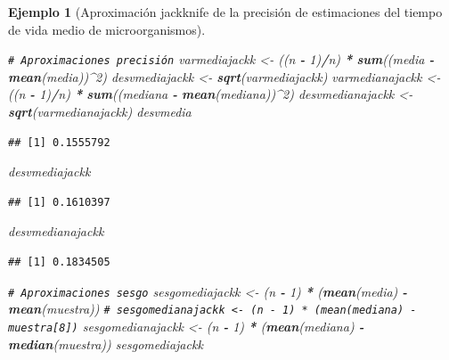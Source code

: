 \documentclass[
]{book}
\newenvironment{Shaded}{\begin{snugshade}}{\end{snugshade}}
\newcommand{\CommentTok}[1]{\textcolor[rgb]{0.56,0.35,0.01}{\textit{#1}}}
\newcommand{\DecValTok}[1]{\textcolor[rgb]{0.00,0.00,0.81}{#1}}
\newcommand{\FunctionTok}[1]{\textcolor[rgb]{0.13,0.29,0.53}{\textbf{#1}}}
\newcommand{\NormalTok}[1]{#1}
\newcommand{\OtherTok}[1]{\textcolor[rgb]{0.56,0.35,0.01}{#1}}
\newcommand{\SpecialCharTok}[1]{\textcolor[rgb]{0.81,0.36,0.00}{\textbf{#1}}}
\theoremstyle{break}
\newtheorem{example}{Ejemplo}[chapter]
\theoremstyle{nonumberplain}
\renewcommand{\CommentTok}[1]{\textcolor[rgb]{0.41,0.41,0.41}{\texttt{#1}}}
\begin{document}
\begin{example}[Aproximación jackknife de la precisión de estimaciones del tiempo de vida medio de microorganismos]
\begin{Shaded}
\begin{Highlighting}[]
\CommentTok{\# Aproximaciones precisión}
\NormalTok{varmediajackk }\OtherTok{\textless{}{-}}\NormalTok{ ((n }\SpecialCharTok{{-}} \DecValTok{1}\NormalTok{)}\SpecialCharTok{/}\NormalTok{n) }\SpecialCharTok{*} \FunctionTok{sum}\NormalTok{((media }\SpecialCharTok{{-}} \FunctionTok{mean}\NormalTok{(media))}\SpecialCharTok{\^{}}\DecValTok{2}\NormalTok{)}
\NormalTok{desvmediajackk }\OtherTok{\textless{}{-}} \FunctionTok{sqrt}\NormalTok{(varmediajackk)}
\NormalTok{varmedianajackk }\OtherTok{\textless{}{-}}\NormalTok{ ((n }\SpecialCharTok{{-}} \DecValTok{1}\NormalTok{)}\SpecialCharTok{/}\NormalTok{n) }\SpecialCharTok{*} \FunctionTok{sum}\NormalTok{((mediana }\SpecialCharTok{{-}} \FunctionTok{mean}\NormalTok{(mediana))}\SpecialCharTok{\^{}}\DecValTok{2}\NormalTok{)}
\NormalTok{desvmedianajackk }\OtherTok{\textless{}{-}} \FunctionTok{sqrt}\NormalTok{(varmedianajackk)}
\NormalTok{desvmedia}
\end{Highlighting}
\end{Shaded}

\begin{verbatim}
## [1] 0.1555792
\end{verbatim}

\begin{Shaded}
\begin{Highlighting}[]
\NormalTok{desvmediajackk}
\end{Highlighting}
\end{Shaded}

\begin{verbatim}
## [1] 0.1610397
\end{verbatim}

\begin{Shaded}
\begin{Highlighting}[]
\NormalTok{desvmedianajackk}
\end{Highlighting}
\end{Shaded}

\begin{verbatim}
## [1] 0.1834505
\end{verbatim}

\begin{Shaded}
\begin{Highlighting}[]
\CommentTok{\# Aproximaciones sesgo}
\NormalTok{sesgomediajackk }\OtherTok{\textless{}{-}}\NormalTok{ (n }\SpecialCharTok{{-}} \DecValTok{1}\NormalTok{) }\SpecialCharTok{*}\NormalTok{ (}\FunctionTok{mean}\NormalTok{(media) }\SpecialCharTok{{-}} \FunctionTok{mean}\NormalTok{(muestra))}
\CommentTok{\# sesgomedianajackk \textless{}{-} (n {-} 1) * (mean(mediana) {-} muestra[8])}
\NormalTok{sesgomedianajackk }\OtherTok{\textless{}{-}}\NormalTok{ (n }\SpecialCharTok{{-}} \DecValTok{1}\NormalTok{) }\SpecialCharTok{*}\NormalTok{ (}\FunctionTok{mean}\NormalTok{(mediana) }\SpecialCharTok{{-}} \FunctionTok{median}\NormalTok{(muestra))}
\NormalTok{sesgomediajackk}
\end{Highlighting}
\end{Shaded}


\end{example}
\end{document}
